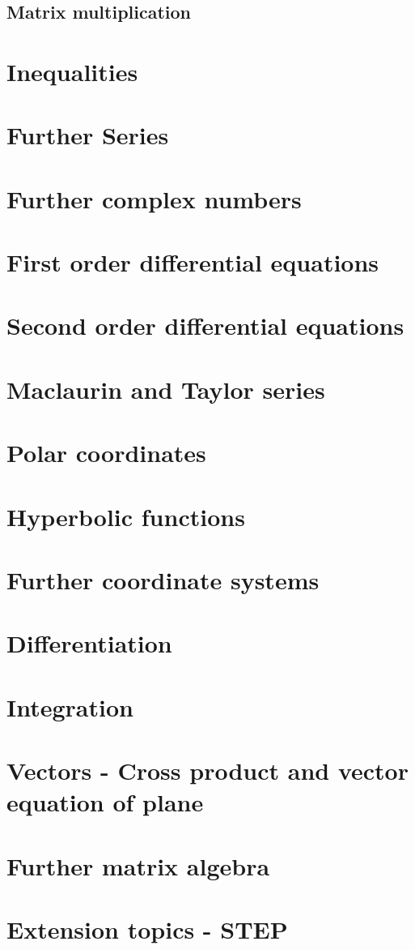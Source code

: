 \documentclass[a4paper]{article}
\begin{document}
\subsection{Matrix multiplication}

\section{Inequalities}

\section{Further Series}

\section{Further complex numbers}

\section{First order differential equations}

\section{Second order differential equations}

\section{Maclaurin and Taylor series}

\section{Polar coordinates}

\section{Hyperbolic functions}

\section{Further coordinate systems}

\section{Differentiation}

\section{Integration}

\section{Vectors - Cross product and vector equation of plane}

\section{Further matrix algebra}

\section{Extension topics - STEP}
\end{document}
